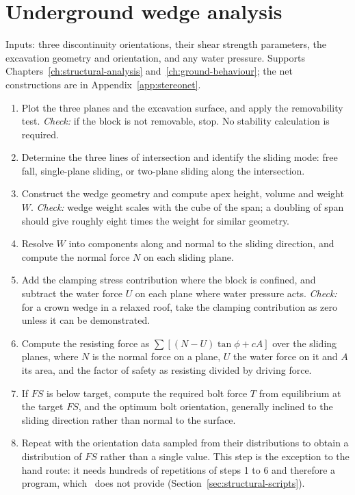 \section{Underground wedge analysis}
\label{sec:seq-wedge}

Inputs: three discontinuity orientations, their shear strength parameters, the
excavation geometry and orientation, and any water pressure. Supports
Chapters~\ref{ch:structural-analysis} and~\ref{ch:ground-behaviour}; the net
constructions are in Appendix~\ref{app:stereonet}.

\begin{enumerate}
  \item Plot the three planes and the excavation surface, and apply the
  removability test.
  \emph{Check:} if the block is not removable, stop. No stability
  calculation is required.

  \item Determine the three lines of intersection and identify the sliding
  mode: free fall, single-plane sliding, or two-plane sliding along the
  intersection.

  \item Construct the wedge geometry and compute apex height, volume and
  weight $W$.
  \emph{Check:} wedge weight scales with the cube of the span; a doubling of
  span should give roughly eight times the weight for similar geometry.

  \item Resolve $W$ into components along and normal to the sliding
  direction, and compute the normal force $N$ on each sliding plane.

  \item Add the clamping stress contribution where the block is confined,
  and subtract the water force $U$ on each plane where water pressure acts.
  \emph{Check:} for a crown wedge in a relaxed roof, take the clamping
  contribution as zero unless it can be demonstrated.

  \item Compute the resisting force as
  $\sum \left[(N-U)\tan\phi + cA\right]$ over the sliding planes, where $N$
  is the normal force on a plane, $U$ the water force on it and $A$ its area,
  and the factor of safety as resisting divided by driving force.

  \item If $FS$ is below target, compute the required bolt force
  $T$ from equilibrium at the target $FS$, and the optimum bolt
  orientation, generally inclined to the sliding direction rather than
  normal to the surface.

  \item Repeat with the orientation data sampled from their distributions to
  obtain a distribution of $FS$ rather than a single value. This step is the
  exception to the hand route: it needs hundreds of repetitions of steps 1
  to 6 and therefore a program, which \companionname\ does not provide
  (Section~\ref{sec:structural-scripts}).
\end{enumerate}

